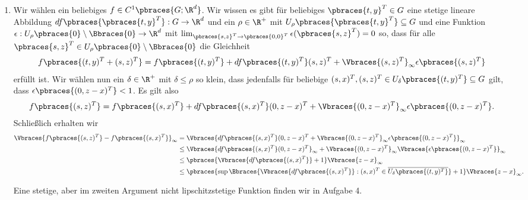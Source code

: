 \begin{solution}
\begin{enumerate}[label = \alph*)]
    \item Wir wählen ein beliebiges $f \in C^1\pbraces{G; \R^d}$. Wir wissen es gibt für beliebiges $\pbraces{t,y}^T \in G$ eine stetige lineare Abbildung $df\pbraces{\pbraces{t,y}^T}: G \to \R^d$ und ein $\rho \in \R^+$ mit $U_\rho\pbraces{\pbraces{t,y}^T} \subseteq G$ und eine Funktion $\epsilon: U_\rho \pbraces{0} \setminus \Bbraces{0} \to \R^d$ mit $\lim_{\pbraces{s,z}^T \to \pbraces{0,0}^T} \epsilon(\pbraces{s,z}^T) = 0$ so, dass für alle $\pbraces{s,z}^T \in U_\rho \pbraces{0} \setminus \Bbraces{0}$ die Gleichheit
    \begin{align*}
      f\pbraces{(t,y)^T + (s,z)^T} = f\pbraces{(t,y)^T} + df\pbraces{(t,y)^T} (s,z)^T + \Vbraces{(s,z)^T}_\infty \epsilon\pbraces{(s,z)^T}
    \end{align*}
    erfüllt ist. Wir wählen nun ein $\delta \in \R^+$ mit $\delta \leq \rho$ so klein, dass jedenfalls für beliebige $(s,x)^T, (s,z)^T \in U_\delta\pbraces{(t,y)^T} \subseteq G$ gilt, dass $\epsilon\pbraces{(0,z - x)^T} < 1$. Es gilt also
    \begin{align*}
      f\pbraces{(s,z)^T} = f\pbraces{(s,x)^T} + df\pbraces{(s,x)^T} (0,z-x)^T + \Vbraces{(0,z - x)^T}_\infty \epsilon\pbraces{(0,z - x)^T}.
    \end{align*}
    Schließlich erhalten wir
    \begin{align*}
      \Vbraces{f\pbraces{(s,z)^T} - f\pbraces{(s,x)^T}}_\infty &= \Vbraces{df\pbraces{(s,x)^T} (0,z-x)^T + \Vbraces{(0,z - x)^T}_\infty \epsilon\pbraces{(0,z - x)^T}}_\infty \\
      &\leq \Vbraces{df\pbraces{(s,x)^T} (0,z-x)^T}_\infty + \Vbraces{(0,z - x)^T}_\infty \Vbraces{\epsilon\pbraces{(0,z - x)^T}}_\infty \\
      &\leq  \pbraces{ \Vbraces{df\pbraces{(s,x)^T}} + 1} \Vbraces{z-x}_\infty \\
      &\leq \pbraces{ \sup\Bbraces{\Vbraces{df\pbraces{(s,x)^T}} : (s,x)^T \in \overline{U_\delta\pbraces{(t,y)^T}}} + 1} \Vbraces{z-x}_\infty.
    \end{align*}

    Eine stetige, aber im zweiten Argument nicht lipschitzstetige Funktion finden wir in Aufgabe 4.
  \end{enumerate}

\end{solution}
